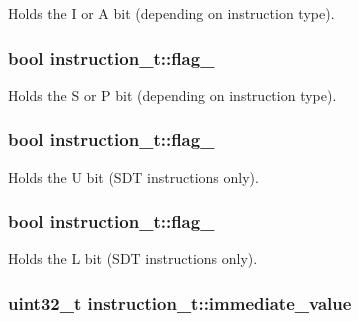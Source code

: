 Holds the I or A bit (depending on instruction type). 

\subsubsection[{\texorpdfstring{flag\+\_\+1}{flag_1}}]{\setlength{\rightskip}{0pt plus 5cm}bool instruction\+\_\+t\+::flag\+\_}\hypertarget{structinstruction__t_a5e38a859429a96a7db9fbcbd452f1a70}{}\label{structinstruction__t_a5e38a859429a96a7db9fbcbd452f1a70}


Holds the S or P bit (depending on instruction type). 

\subsubsection[{\texorpdfstring{flag\+\_\+2}{flag_2}}]{\setlength{\rightskip}{0pt plus 5cm}bool instruction\+\_\+t\+::flag\+\_}\hypertarget{structinstruction__t_a185bd7654f18f654b666ccfe1d857659}{}\label{structinstruction__t_a185bd7654f18f654b666ccfe1d857659}


Holds the U bit (S\+DT instructions only). 

\subsubsection[{\texorpdfstring{flag\+\_\+3}{flag_3}}]{\setlength{\rightskip}{0pt plus 5cm}bool instruction\+\_\+t\+::flag\+\_}\hypertarget{structinstruction__t_a004b3ac9779d188ae99bc0c7180dab8d}{}\label{structinstruction__t_a004b3ac9779d188ae99bc0c7180dab8d}


Holds the L bit (S\+DT instructions only). 

\subsubsection[{\texorpdfstring{immediate\+\_\+value}{immediate_value}}]{\setlength{\rightskip}{0pt plus 5cm}uint32\+\_\+t instruction\+\_\+t\+::immediate\+\_\+value}\hypertarget{structinstruction__t_a6137fca8ba59012415bd91175ecbc0c2}{}\label{structinstruction__t_a6137fca8ba59012415bd91175ecbc0c2}


